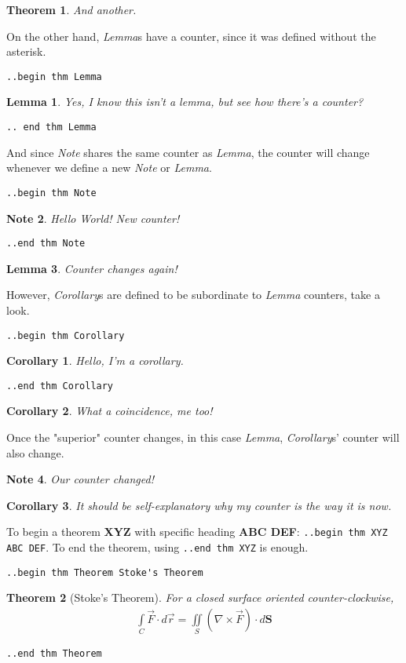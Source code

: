 \documentclass[12pt]{article}
\newcommand{\del}{\nabla}
\newcommand{\ital}{\emph}
\newcommand{\cross}{\times}
\renewcommand\bold{\textbf}
\newtheorem*{Theorem}{Theorem}
\newtheorem{Lemma}{Lemma}
\newtheorem{Corollary}{Corollary}[Lemma]
\newtheorem{Note}[Lemma]{Note}
\begin{document}
\begin{flushleft}
\begin{Theorem}
And another.
\end{Theorem}

On the other hand, \ital{Lemma}s have a counter, since it was defined without the asterisk.

\medskip
\verb|..begin thm Lemma|
\begin{Lemma}
Yes, I know this isn't a lemma, but see how there's a counter?
\end{Lemma}
\verb|.. end thm Lemma|
\medskip

And since \ital{Note} shares the same counter as \ital{Lemma}, the counter will change whenever we define
a new \ital{Note} or \ital{Lemma}.

\medskip
\verb|..begin thm Note|
\begin{Note}
Hello World! New counter!
\end{Note}
\verb|..end thm Note|
\medskip

\begin{Lemma}
Counter changes again!
\end{Lemma}

However, \ital{Corollary}s are defined to be subordinate to \ital{Lemma} counters, take a look.

\medskip
\verb|..begin thm Corollary|
\begin{Corollary}
Hello, I'm a corollary.
\end{Corollary}
\verb|..end thm Corollary|
\medskip

\begin{Corollary}
What a coincidence, me too!
\end{Corollary}

Once the "superior" counter changes, in this case \ital{Lemma}, \ital{Corollary}s' counter will also change.

\begin{Note}
Our counter changed!
\end{Note}

\begin{Corollary}
It should be self-explanatory why my counter is the way it is now.
\end{Corollary}

\bigskip
To begin a theorem \bold{XYZ} with specific heading \bold{ABC DEF}: \verb|..begin thm XYZ ABC DEF|. To end the theorem, using \verb|..end thm XYZ| is enough.

\medskip
\verb|..begin thm Theorem Stoke's Theorem|
\begin{Theorem}[Stoke's Theorem]
For a closed surface oriented counter-clockwise,
\begin{gather*}
\int\limits_C \vec{F} \cdot d\vec{r} = \iint\limits_S (\del \cross \vec{F}) \cdot d\bold{S} 
\end{gather*}
\end{Theorem}
\verb|..end thm Theorem|
\medskip


\end{flushleft}
\end{document}
